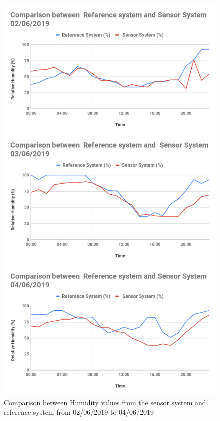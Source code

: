 \begin{figure}[h]
  \begin{center}
  \includegraphics[scale=0.45]{images/figure88hum.png}
  \end{center}
  \caption{Comparison between Humidity values from the sensor system and reference system from 02/06/2019 to 04/06/2019}
  \label{hum1}

\end{figure}



